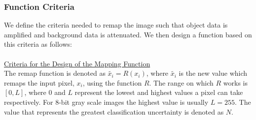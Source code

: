 \documentclass[a4paper,11pt]{ijamas}
\begin{document}
\subsubsection{Function Criteria}
\label{sec:functioncriteria}

We define the criteria needed to remap the image such that object data is amplified and background data is attenuated. We then design a function based on this criteria as follows: \\ \\
\underline{Criteria for the Design of the Mapping Function}\\
The remap function is denoted as $\widetilde{x_i} = R(x_i)$, where $\widetilde{x_i}$ is the new value which remaps the input pixel, $x_i$, using the function $R$. The range on which $R$ works is $[0,L]$, where $0$ and $L$ represent the lowest and highest values a pixel can take respectively. For 8-bit gray scale images the highest value is usually $L=255$. The value that represents the greatest classification uncertainty is denoted as $N$.
\end{document}
